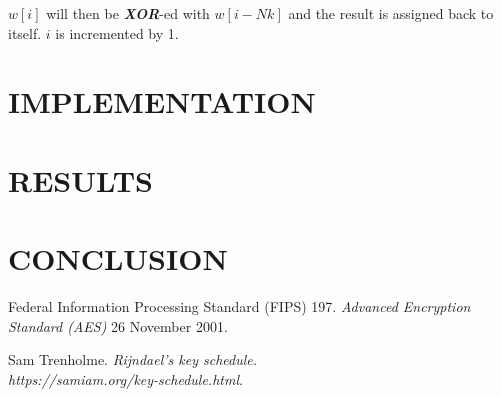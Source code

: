 \documentclass[a4paper, 10pt]{article}
\begin{document}
\begin{multicols}{2}
                $w[i]$ will then be \textbf{\textit{XOR}}-ed with $w[i-Nk]$ and the result is assigned back to itself. $i$ is incremented by 1.

        \section{IMPLEMENTATION}

        \section{RESULTS}

        \section{CONCLUSION}

        \begin{thebibliography}{3}
            Federal Information Processing Standard (FIPS) 197.
            \textit{Advanced Encryption Standard (AES)}
            26 November 2001.

            Sam Trenholme.
            \textit{Rijndael's key schedule.\\https://samiam.org/key-schedule.html}.
        \end{thebibliography}

    \end{multicols}
\end{document}
